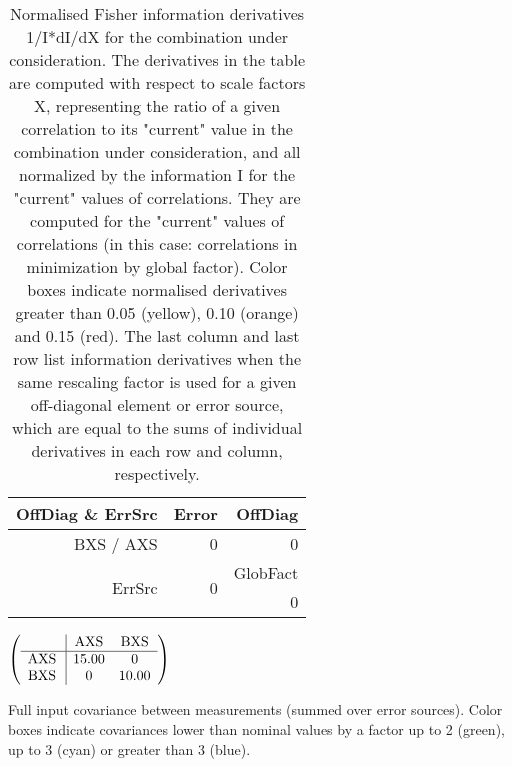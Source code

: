 \begin{table}[H]
\scriptsize
\begin{center}
\renewcommand{\arraystretch}{1.1}
\begin{tabular}{|r|r|r|}
\hline
 OffDiag \& ErrSrc & {\tiny Error} & OffDiag\\
\hline
BXS / AXS &  0 &  0 \\
\hline
\multirow{2}{*}{ErrSrc} & \multirow{2}{*}{ 0} & GlobFact\\
 & &  0 \\
\hline
\end{tabular}
\renewcommand{\arraystretch}{1}
\caption{Normalised Fisher information derivatives 1/I*dI/dX for the combination under consideration. The derivatives in the table are computed with respect to scale factors X, representing the ratio of a given correlation to its "current" value in the combination under consideration, and all normalized by the information I for the "current" values of correlations. They are computed for the "current" values of correlations (in this case: correlations in minimization by global factor). Color boxes indicate normalised derivatives greater than 0.05 (yellow), 0.10 (orange) and 0.15 (red). The last column and last row list information derivatives when the same rescaling factor is used for a given off-diagonal element or error source, which are equal to the sums of individual derivatives in each row and column, respectively.}
\end{center}
\end{table}
\begin{table}[H]
\scriptsize
\begin{center}
\renewcommand{\arraystretch}{1.1}
\begin{math}\left(\begin{array}{c|cc}
 & \mathrm{AXS} & 
\mathrm{BXS} \\
\hline
\mathrm{AXS} \hspace*{2pt} &      15.00 &  0 \\
\mathrm{BXS} \hspace*{2pt} &  0 &      10.00 \\
\end{array}\right)\end{math}
\caption{Full input covariance between measurements (summed over error sources). Color boxes indicate covariances lower than nominal values by a factor up to 2 (green), up to 3 (cyan) or greater than 3 (blue).}
\renewcommand{\arraystretch}{1}
\end{center}
\end{table}
